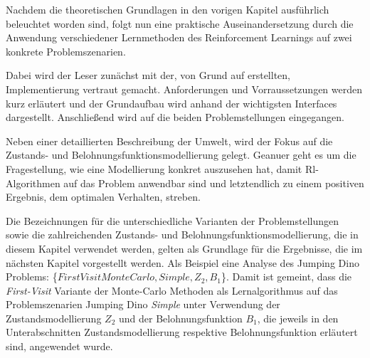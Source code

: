 Nachdem die theoretischen Grundlagen in den vorigen Kapitel ausführlich beleuchtet worden sind, folgt nun eine praktische Auseinandersetzung durch die Anwendung verschiedener Lernmethoden des Reinforcement Learnings auf zwei konkrete Problemszenarien. 
\par 
Dabei wird der Leser zunächst mit der, von Grund auf erstellten, Implementierung vertraut gemacht. Anforderungen und Vorraussetzungen werden kurz erläutert und der Grundaufbau wird anhand der wichtigsten Interfaces dargestellt. Anschließend wird auf die beiden Problemstellungen eingegangen. 
\par 
Neben einer detaillierten Beschreibung der Umwelt, wird der Fokus auf die Zustands- und Belohnungsfunktionsmodellierung gelegt. Geanuer geht es um die Fragestellung, wie eine Modellierung konkret auszusehen hat, damit Rl-Algorithmen auf das Problem anwendbar sind und letztendlich zu einem positiven Ergebnis, dem optimalen Verhalten, streben.
\par
Die Bezeichnungen für die unterschiedliche Varianten der Problemstellungen sowie die zahlreichenden Zustands- und Belohnungsfunktionsmodellierung, die in diesem Kapitel verwendet werden, gelten als Grundlage für die Ergebnisse, die im nächsten Kapitel vorgestellt werden. Als Beispiel eine Analyse des Jumping Dino Problems: \{$FirstVisitMonteCarlo,Simple, Z_2, B_1$\}. Damit ist gemeint, dass die \textit{First-Visit }Variante der Monte-Carlo Methoden als Lernalgorithmus auf das Problemszenarien Jumping Dino \textit{Simple} unter Verwendung der Zustandsmodellierung $Z_2$ und der Belohnungsfunktion $B_1$, die jeweils in den Unterabschnitten \glqq Zustandsmodellierung\grqq{} respektive \glqq Belohnungsfunktion\grqq{} erläutert sind, angewendet wurde.